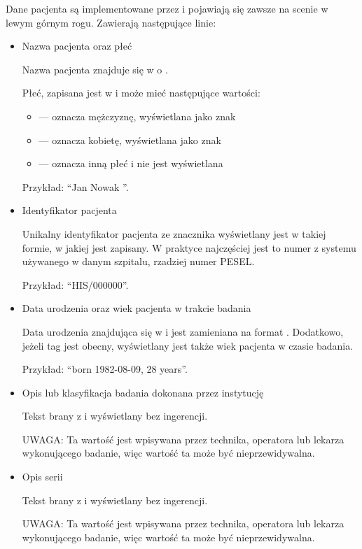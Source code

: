 Dane pacjenta są implementowane przez  i pojawiają się zawsze na scenie w lewym górnym rogu.
Zawierają następujące linie:
\begin{itemize}
    \item Nazwa pacjenta oraz płeć

          Nazwa pacjenta znajduje się w  o .

          Płeć, zapisana jest w  i może mieć następujące wartości:
          \begin{itemize}
              \item {} --- oznacza mężczyznę, wyświetlana jako znak \utfMaleSign
              \item {} --- oznacza kobietę, wyświetlana jako znak \utfFemaleSign
              \item {} --- oznacza inną płeć i nie jest wyświetlana
          \end{itemize}

          Przykład: \enquote{Jan Nowak \utfMaleSign}.

    \item Identyfikator pacjenta

          Unikalny identyfikator pacjenta ze znacznika  wyświetlany jest w takiej formie, w jakiej jest zapisany.
          W praktyce najczęściej jest to numer z systemu używanego w danym szpitalu, rzadziej numer PESEL.

          Przykład: \enquote{HIS/000000}.

    \item Data urodzenia oraz wiek pacjenta w trakcie badania

          Data urodzenia znajdująca się w  i jest zamieniana na format .
          Dodatkowo, jeżeli tag  jest obecny, wyświetlany jest także wiek pacjenta w czasie badania.

          Przykład: \enquote{born 1982-08-09, 28 years}.

    \item Opis lub klasyfikacja badania dokonana przez instytucję

          Tekst brany z  i wyświetlany bez ingerencji.

          UWAGA: Ta wartość jest wpisywana przez technika, operatora lub lekarza wykonującego badanie, więc wartość ta może być nieprzewidywalna.

    \item Opis serii

          Tekst brany z  i wyświetlany bez ingerencji.

          UWAGA: Ta wartość jest wpisywana przez technika, operatora lub lekarza wykonującego badanie, więc wartość ta może być nieprzewidywalna.
\end{itemize}

